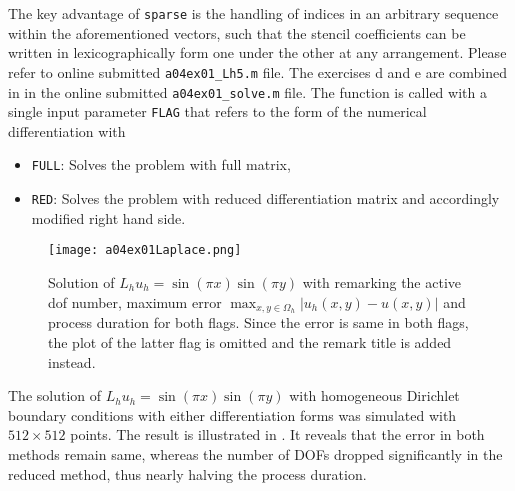 The key advantage of \texttt{sparse} is the handling of indices in an arbitrary sequence within the aforementioned vectors, such that the stencil coefficients can be written in lexicographically form one under the other at any arrangement.
%
Please refer to online submitted \texttt{a04ex01\_Lh5.m} file.
%
The exercises d and e are combined in in the online submitted \texttt{a04ex01\_solve.m} file.
The function is called with a single input parameter \texttt{FLAG} that refers to the form of the numerical differentiation with
\begin{itemize}
	\item \texttt{FULL}: Solves the problem with full matrix,
	\item \texttt{RED}: Solves the problem with reduced differentiation matrix and accordingly modified right hand side.
\end{itemize}
\begin{figure}[H]
	\texttt{[image: a04ex01Laplace.png]} 
	\caption{Solution of $L_h u_h = \sin{(\pi x)} \sin{(\pi y)}$ with remarking the active dof number, maximum error $\max_{x,y \in \Omega_h} |u_h (x,y) - u(x,y)|$ and process duration for both flags. Since the error is same in both flags, the plot of the latter flag is omitted and the remark title is added instead.}
	\label{fig:a04ex01Laplace}
\end{figure}

The solution of $L_h u_h = \sin{(\pi x)} \sin{(\pi y)} $ with homogeneous Dirichlet boundary conditions with either differentiation forms was simulated with $512 \times 512$ points.
The result is illustrated in .
It reveals that the error in both methods remain same, whereas the number of DOFs dropped significantly in the reduced method, thus nearly halving the process duration.
%
%

%

%
%

%

%

%
